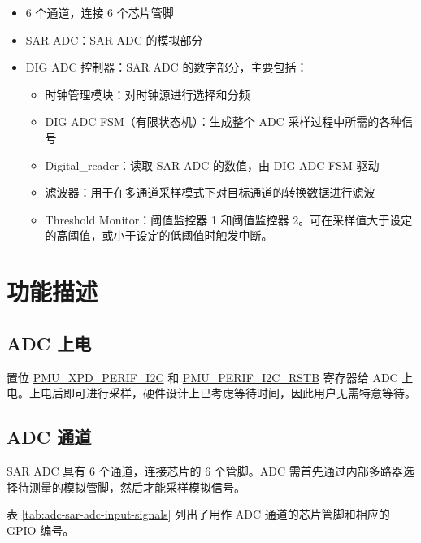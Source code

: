 \documentclass[main\_\_CN.tex]{subfiles}
\begin{document}
\begin{itemize}
    \item 6 个通道，连接 6 个芯片管脚
    \item SAR ADC：SAR ADC 的模拟部分
    \item DIG ADC 控制器：SAR ADC 的数字部分，主要包括：
    \begin{itemize}
        \item 时钟管理模块：对时钟源进行选择和分频
        \item DIG ADC FSM（有限状态机）：生成整个 ADC 采样过程中所需的各种信号
        \item Digital\_reader：读取 SAR ADC 的数值，由 DIG ADC FSM 驱动
        \item 滤波器：用于在多通道采样模式下对目标通道的转换数据进行滤波
        \item Threshold Monitor：阈值监控器 1 和阈值监控器 2。可在采样值大于设定的高阈值，或小于设定的低阈值时触发中断。
    \end{itemize}
\end{itemize}



\section{功能描述}
\label{sec:sar-adc-func-descr}

\subsection{ADC 上电}
\label{sec:sar-adc-power-up}

置位 \hyperref[fielddesc:PMUXPDPERIFI2C]{PMU\_XPD\_PERIF\_I2C} 和 \hyperref[fielddesc:PMUPERIFI2CRSTB]{PMU\_PERIF\_I2C\_RSTB} 寄存器给 ADC 上电。上电后即可进行采样，硬件设计上已考虑等待时间，因此用户无需特意等待。
\subsection{ADC 通道}
\label{sec:sar-adc-channels}

SAR ADC 具有 6 个通道，连接芯片的 6 个管脚。ADC 需首先通过内部多路器选择待测量的模拟管脚，然后才能采样模拟信号。

表 \ref{tab:adc-sar-adc-input-signals} 列出了用作 ADC 通道的芯片管脚和相应的 GPIO 编号。
\end{document}
